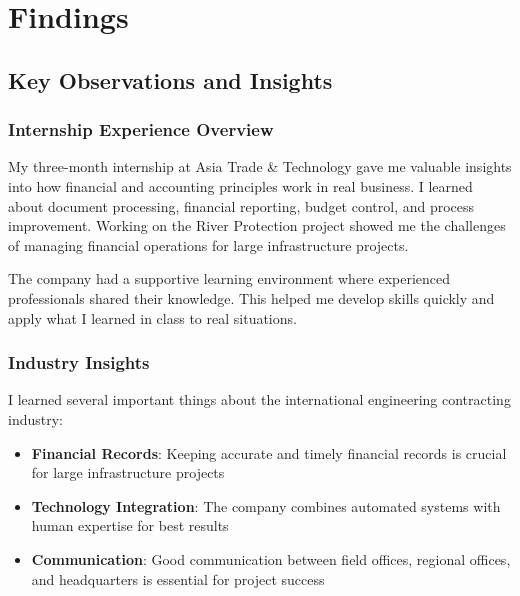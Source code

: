 
\chapter{Findings}

\section{Key Observations and Insights}

\subsection{Internship Experience Overview}
My three-month internship at Asia Trade \& Technology gave me valuable insights into how financial and accounting principles work in real business. I learned about document processing, financial reporting, budget control, and process improvement. Working on the River Protection project showed me the challenges of managing financial operations for large infrastructure projects.

The company had a supportive learning environment where experienced professionals shared their knowledge. This helped me develop skills quickly and apply what I learned in class to real situations.

\vspace{0.3em}
\subsection{Industry Insights}
I learned several important things about the international engineering contracting industry:

\begin{itemize}[leftmargin=*, itemsep=0.25em]
    \item \textbf{Financial Records}: Keeping accurate and timely financial records is crucial for large infrastructure projects
    \item \textbf{Technology Integration}: The company combines automated systems with human expertise for best results
    \item \textbf{Communication}: Good communication between field offices, regional offices, and headquarters is essential for project success
\end{itemize}

